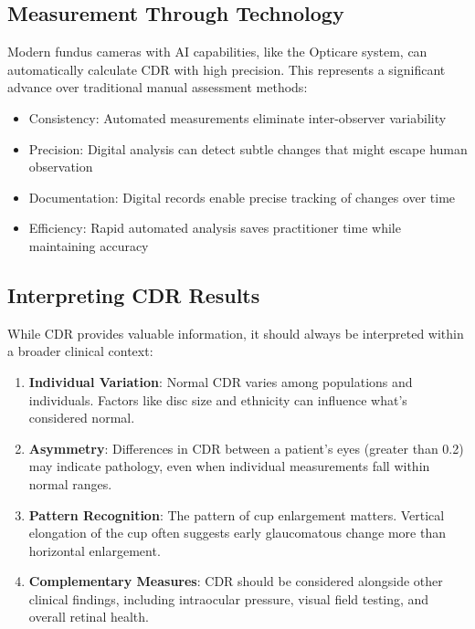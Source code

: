 \documentclass[
  Letterpaper,
]{scrbook}
\providecommand{\tightlist}{%
  \setlength{\itemsep}{0pt}\setlength{\parskip}{0pt}}\usepackage{longtable,booktabs,array}
\begin{document}
\subsection{Measurement Through
Technology}\label{measurement-through-technology}

Modern fundus cameras with AI capabilities, like the Opticare system,
can automatically calculate CDR with high precision. This represents a
significant advance over traditional manual assessment methods:

\begin{itemize}
\tightlist
\item
  Consistency: Automated measurements eliminate inter-observer
  variability
\item
  Precision: Digital analysis can detect subtle changes that might
  escape human observation
\item
  Documentation: Digital records enable precise tracking of changes over
  time
\item
  Efficiency: Rapid automated analysis saves practitioner time while
  maintaining accuracy
\end{itemize}

\subsection{Interpreting CDR Results}\label{interpreting-cdr-results}

While CDR provides valuable information, it should always be interpreted
within a broader clinical context:

\begin{enumerate}
\def\labelenumi{\arabic{enumi}.}
\item
  \textbf{Individual Variation}: Normal CDR varies among populations and
  individuals. Factors like disc size and ethnicity can influence what's
  considered normal.
\item
  \textbf{Asymmetry}: Differences in CDR between a patient's eyes
  (greater than 0.2) may indicate pathology, even when individual
  measurements fall within normal ranges.
\item
  \textbf{Pattern Recognition}: The pattern of cup enlargement matters.
  Vertical elongation of the cup often suggests early glaucomatous
  change more than horizontal enlargement.
\item
  \textbf{Complementary Measures}: CDR should be considered alongside
  other clinical findings, including intraocular pressure, visual field
  testing, and overall retinal health.
\end{enumerate}
\end{document}
